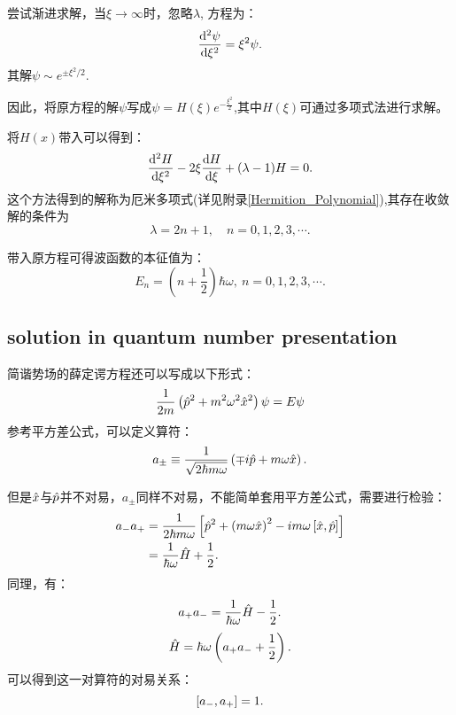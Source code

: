尝试渐进求解，当$\xi\to\infty$时，忽略$\lambda$, 方程为：
\begin{equation}
    \frac{\mathrm{d}^2 \psi}{\mathrm{d} \xi^2}=\xi^2\psi.
\end{equation}
其解$\psi\sim e^{\pm\xi^2/2}$.

因此，将原方程的解$\psi$写成$\psi=H(\xi)e^{-\frac{\xi^2}{2}}$,其中$H(\xi)$可通过多项式法进行求解。

将$H(x)$带入可以得到：
\begin{equation}
    \frac{\mathrm{d}^2 H}{\mathrm{d} \xi^2}-2\xi\frac{\mathrm{d} H}{\mathrm{d} \xi}+(\lambda-1)H=0.
\end{equation}
这个方法得到的解称为厄米多项式(详见附录\ref{Hermition_Polynomial}),其存在收敛解的条件为
\begin{equation}
    \lambda=2n+1, \quad n=0,1,2,3,\cdots.
\end{equation}

带入原方程可得波函数的本征值为：
\begin{equation}
    E_n=\left(n+\frac{1}{2}\right)\hbar\omega,\ n=0,1,2,3,\cdots. 
\end{equation}

\subsection{solution in quantum number presentation}

简谐势场的薛定谔方程还可以写成以下形式：
\begin{equation}
    \frac{1}{2m}\left(\hat{p}^2+m^2\omega^2\hat{x}^2\right)\psi=E\psi
\end{equation}
参考平方差公式，可以定义算符：
\begin{equation}
    a_{\pm}\equiv \frac{1}{\sqrt{2\hbar m\omega}}\left(\mp i\hat{p}+m\omega \hat{x}\right).
\end{equation}

但是$\hat{x}$与$\hat{p}$并不对易，$a_{\pm}$同样不对易，不能简单套用平方差公式，需要进行检验：
\begin{equation}
    \begin{aligned}
        a_-a_+&=\frac{1}{2\hbar m\omega}\left[\hat{p}^2+\left(m\omega\hat{x}\right)^2-im\omega\left[\hat{x},\hat{p}\right]\right]\\
        &=\frac{1}{\hbar\omega}\hat{H}+\frac{1}{2}.
    \end{aligned}
\end{equation}
同理，有：
\begin{equation}
    a_+a_-=\frac{1}{\hbar\omega}\hat{H}-\frac{1}{2}.
\end{equation}
\begin{equation}
    \hat{H}=\hbar\omega\left(a_+a_-+\frac{1}{2}\right).
\end{equation}
可以得到这一对算符的对易关系：
\begin{equation}
    \left[a_-,a_+\right]=1.
\end{equation}

